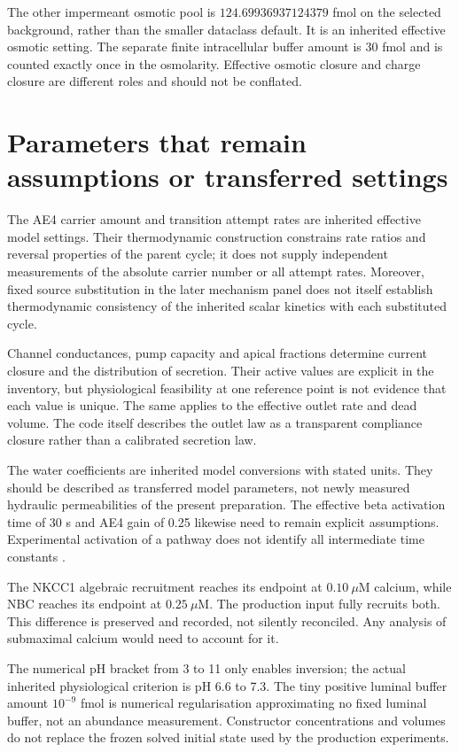 \documentclass[11pt,a4paper]{article}
\begin{document}
The other impermeant osmotic pool is $124.69936937124379$ fmol on the selected background, rather than the smaller dataclass default. It is an inherited effective osmotic setting. The separate finite intracellular buffer amount is 30 fmol and is counted exactly once in the osmolarity. Effective osmotic closure and charge closure are different roles and should not be conflated.

\section{Parameters that remain assumptions or transferred settings}
The AE4 carrier amount and transition attempt rates are inherited effective model settings. Their thermodynamic construction constrains rate ratios and reversal properties of the parent cycle; it does not supply independent measurements of the absolute carrier number or all attempt rates. Moreover, fixed source substitution in the later mechanism panel does not itself establish thermodynamic consistency of the inherited scalar kinetics with each substituted cycle.

Channel conductances, pump capacity and apical fractions determine current closure and the distribution of secretion. Their active values are explicit in the inventory, but physiological feasibility at one reference point is not evidence that each value is unique. The same applies to the effective outlet rate and dead volume. The code itself describes the outlet law as a transparent compliance closure rather than a calibrated secretion law.

The water coefficients are inherited model conversions with stated units. They should be described as transferred model parameters, not newly measured hydraulic permeabilities of the present preparation. The effective beta activation time of 30 s and AE4 gain of 0.25 likewise need to remain explicit assumptions. Experimental activation of a pathway does not identify all intermediate time constants \citep{Pena2021}.

The NKCC1 algebraic recruitment reaches its endpoint at $0.10\ \mu$M calcium, while NBC reaches its endpoint at $0.25\ \mu$M. The production input fully recruits both. This difference is preserved and recorded, not silently reconciled. Any analysis of submaximal calcium would need to account for it.

The numerical pH bracket from 3 to 11 only enables inversion; the actual inherited physiological criterion is pH 6.6 to 7.3. The tiny positive luminal buffer amount $10^{-9}$ fmol is numerical regularisation approximating no fixed luminal buffer, not an abundance measurement. Constructor concentrations and volumes do not replace the frozen solved initial state used by the production experiments.
\end{document}
